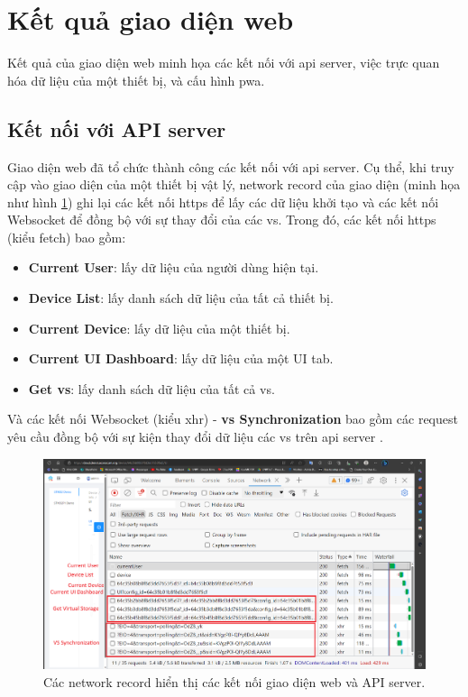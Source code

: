 \section{Kết quả giao diện web}

Kết quả của giao diện web minh họa các kết nối với \acrshort{api} server, việc trực quan hóa dữ liệu của một thiết bị, và cấu hình \acrfull{pwa}.

\subsection{Kết nối với API server}

Giao diện web đã tổ chức thành công các kết nối với \acrshort{api} server. Cụ thể, khi truy cập vào giao diện của một thiết bị vật lý, network record của giao diện (minh họa như hình \ref{fig:network-fetch}) ghi lại các kết nối \acrshort{https} để lấy các dữ liệu khởi tạo và các kết nối Websocket để đồng bộ với sự thay đổi của các \acrshort{vs}. Trong đó, các kết nối \acrshort{https} (kiểu fetch) bao gồm:
\begin{itemize}
    \item \textbf{Current User}: lấy dữ liệu của người dùng hiện tại.
    \item \textbf{Device List}: lấy danh sách dữ liệu của tất cả thiết bị.
    \item \textbf{Current Device}: lấy dữ liệu của một thiết bị.
    \item \textbf{Current UI Dashboard}: lấy dữ liệu của một UI tab.
    \item \textbf{Get \acrlong{vs}}: lấy danh sách dữ liệu của tất cả \acrshort{vs}.
\end{itemize}

Và các kết nối Websocket (kiểu xhr) - \textbf{\acrshort{vs} Synchronization} bao gồm các request yêu cầu đồng bộ với sự kiện thay đổi dữ liệu các \acrshort{vs} trên \acrshort{api} server .

\begin{figure}[htp]
\centering
\captionsetup{justification=centering,margin=2cm}
\includegraphics[width=1.0\linewidth, frame]{images/fig-network-fetch.png}
\caption{Các network record hiển thị các kết nối giao diện web và API server.}
\label{fig:network-fetch}
\end{figure}

